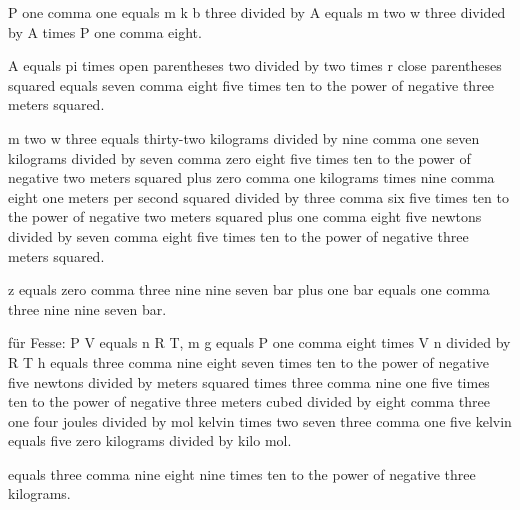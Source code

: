 P one comma one equals m k b three divided by A equals m two w three divided by A times P one comma eight.

A equals pi times open parentheses two divided by two times r close parentheses squared equals seven comma eight five times ten to the power of negative three meters squared.

m two w three equals thirty-two kilograms divided by nine comma one seven kilograms divided by seven comma zero eight five times ten to the power of negative two meters squared plus zero comma one kilograms times nine comma eight one meters per second squared divided by three comma six five times ten to the power of negative two meters squared plus one comma eight five newtons divided by seven comma eight five times ten to the power of negative three meters squared.

z equals zero comma three nine nine seven bar plus one bar equals one comma three nine nine seven bar.

für Fesse: P V equals n R T, m g equals P one comma eight times V n divided by R T h equals three comma nine eight seven times ten to the power of negative five newtons divided by meters squared times three comma nine one five times ten to the power of negative three meters cubed divided by eight comma three one four joules divided by mol kelvin times two seven three comma one five kelvin equals five zero kilograms divided by kilo mol.

equals three comma nine eight nine times ten to the power of negative three kilograms.